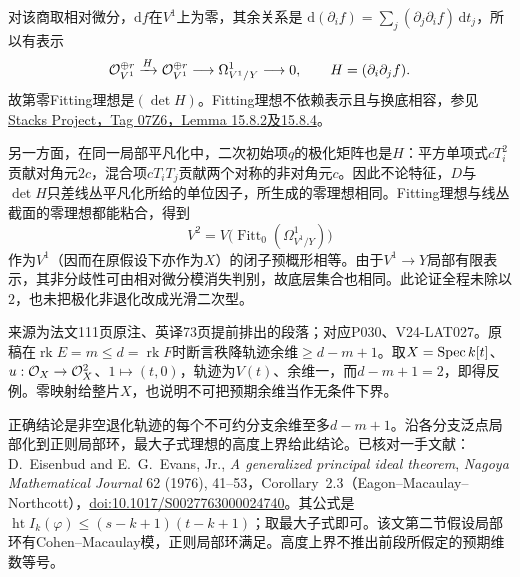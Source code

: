 对该商取相对微分，$\mathrm df$在$V^1$上为零，其余关系是
$\mathrm d(\partial_i f)=\sum_j(\partial_j\partial_i f)\,\mathrm dt_j$，所以有表示
\[
\mathcal O_{V^1}^{\oplus r}\xrightarrow{H}
\mathcal O_{V^1}^{\oplus r}\longrightarrow\Omega^1_{V^1/Y}\longrightarrow0,
\qquad H=(\partial_i\partial_jf).
\]
故第零Fitting理想是$(\det H)$。Fitting理想不依赖表示且与换底相容，参见\href{https://stacks.math.columbia.edu/tag/07Z6}{Stacks Project，Tag 07Z6，Lemma 15.8.2及15.8.4}。

另一方面，在同一局部平凡化中，二次初始项$q$的极化矩阵也是$H$：平方单项式$cT_i^2$贡献对角元$2c$，混合项$cT_iT_j$贡献两个对称的非对角元$c$。因此不论特征，$D$与$\det H$只差线丛平凡化所给的单位因子，所生成的零理想相同。Fitting理想与线丛截面的零理想都能粘合，得到
\[
V^2=V\bigl(\operatorname{Fitt}_0(\Omega^1_{V^1/Y})\bigr)
\]
作为$V^1$（因而在原假设下亦作为$X$）的闭子预概形相等。由于$V^1\to Y$局部有限表示，其非分歧性可由相对微分模消失判别，故底层集合也相同。此论证全程未除以$2$，也未把极化非退化改成光滑二次型。

来源为法文111页原注、英译73页提前排出的段落；对应P030、V24-LAT027。原稿在$\operatorname{rk}E=m\le d=\operatorname{rk}F$时断言秩降轨迹余维$\ge d-m+1$。取$X=\operatorname{Spec} k[t]$、$u:\mathcal O_X\to\mathcal O_X^2$、$1\mapsto(t,0)$，轨迹为$V(t)$、余维一，而$d-m+1=2$，即得反例。零映射给整片$X$，也说明不可把预期余维当作无条件下界。

正确结论是非空退化轨迹的每个不可约分支余维至多$d-m+1$。沿各分支泛点局部化到正则局部环，最大子式理想的高度上界给此结论。已核对一手文献：D.~Eisenbud and E.~G.~Evans, Jr., \emph{A generalized principal ideal theorem}, \emph{Nagoya Mathematical Journal} 62 (1976), 41--53，Corollary~2.3（Eagon--Macaulay--Northcott），\href{https://doi.org/10.1017/S0027763000024740}{doi:10.1017/S0027763000024740}。其公式是
$\operatorname{ht}I_k(\varphi)\le(s-k+1)(t-k+1)$；取最大子式即可。该文第二节假设局部环有Cohen--Macaulay模，正则局部环满足。高度上界不推出前段所假定的预期维数等号。

